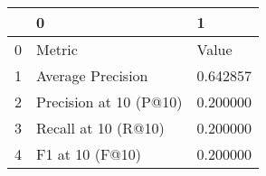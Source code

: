 \begin{tabular}{lll}
\toprule
 & 0 & 1 \\
\midrule
0 & Metric & Value \\
1 & Average Precision & 0.642857 \\
2 & Precision at 10 (P@10) & 0.200000 \\
3 & Recall at 10 (R@10) & 0.200000 \\
4 & F1 at 10 (F@10) & 0.200000 \\
\bottomrule
\end{tabular}

